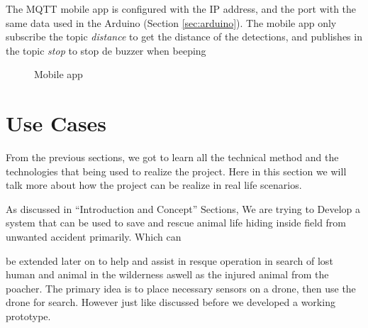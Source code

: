 \documentclass[12pt]{article}
\begin{document}
The MQTT mobile app is configured with the IP address, and the port with the same data used in the Arduino (Section \ref{sec:arduino}). The mobile app only subscribe the topic \textit{distance} to get the distance of the detections, and publishes in the topic \textit{stop} to stop de buzzer when beeping 

\begin{figure}[h]
\caption{Mobile app}
\label{fig:phone1}
\end{figure}


\section{Use Cases}

From the previous sections, we got to learn all the technical method and the technologies that being used to realize the project. Here in this section we will talk more about how the project can be realize in real life scenarios.

As discussed in “Introduction and Concept” Sections, We are trying to Develop a system that can be used to save and rescue animal life hiding inside field from unwanted accident primarily. Which can

be extended later on to help and assist in resque operation in search of lost human and animal in the wilderness aswell as the injured animal from the poacher. The primary idea is to place necessary sensors on a drone, then use the drone for search. However just like discussed before we developed a working prototype.
\end{document}
